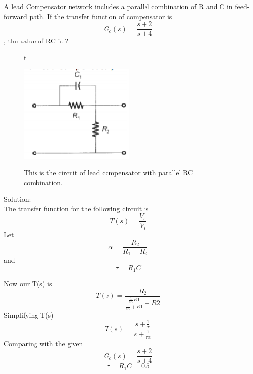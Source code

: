 \begin{enumerate}[label=\thesection.\arabic*.,ref=\thesection.\theenumi]

\begin{frame}
   A lead Compensator network includes a parallel combination of R and C in feed-forward path. If the transfer function of compensator  is $$G_c(s) = \frac{s+2}{s+4}$$, the value of RC is ?\\
\begin{figure}{t}
    \graphicspath{{./images/}}
    \includegraphics{figs/circuit_lead_compensator.eps}{}
    \centering
    \par
This is the circuit of lead compensator with parallel RC combination.
\end{figure}
Solution:\\
The transfer function for the following circuit is
    $$
    T(s) = \frac{V_o}{V_i}
    $$
    Let
    $$
    \alpha = \frac{R_2}{R_1 + R_2}
    $$
    and 
    $$
    \tau = R_1C
    $$

Now our T(s) is 
    $$
    T(s) = \frac{R_2}{\frac{\frac{1}{sC}R1}{\frac{1}{sC}+R1} + R2}
    $$
    Simplifying T(s)
    $$
    T(s) = \frac{s+\frac{1}{\tau}}{s+\frac{1}{\tau\alpha}}
    $$
    Comparing with the given $$G_c(s) = \frac{s+2}{s+4}$$
    $$
    \tau = R_1C = 0.5
    $$
\end{frame}

\end{enumerate}
